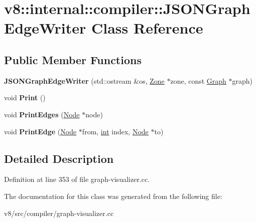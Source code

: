 \hypertarget{classv8_1_1internal_1_1compiler_1_1JSONGraphEdgeWriter}{}\section{v8\+:\+:internal\+:\+:compiler\+:\+:J\+S\+O\+N\+Graph\+Edge\+Writer Class Reference}
\label{classv8_1_1internal_1_1compiler_1_1JSONGraphEdgeWriter}
\subsection*{Public Member Functions}
\begin{DoxyCompactItemize}
\item 
\mbox{\label{classv8_1_1internal_1_1compiler_1_1JSONGraphEdgeWriter_a9193915a7479dc4635125e0f504cab19}} 
{\bfseries J\+S\+O\+N\+Graph\+Edge\+Writer} (std\+::ostream \&os, \mbox{\hyperlink{classv8_1_1internal_1_1Zone}{Zone}} $\ast$zone, const \mbox{\hyperlink{classv8_1_1internal_1_1compiler_1_1Graph}{Graph}} $\ast$graph)
\item 
\mbox{\label{classv8_1_1internal_1_1compiler_1_1JSONGraphEdgeWriter_aff9f180341a91e7ea140ae08df1ed689}} 
void {\bfseries Print} ()
\item 
\mbox{\label{classv8_1_1internal_1_1compiler_1_1JSONGraphEdgeWriter_a45ed893eccb7d258a853f82004e3f3cf}} 
void {\bfseries Print\+Edges} (\mbox{\hyperlink{classv8_1_1internal_1_1compiler_1_1Node}{Node}} $\ast$node)
\item 
\mbox{\label{classv8_1_1internal_1_1compiler_1_1JSONGraphEdgeWriter_a2d46147f53d1ebe6bda29f5c7aced3e6}} 
void {\bfseries Print\+Edge} (\mbox{\hyperlink{classv8_1_1internal_1_1compiler_1_1Node}{Node}} $\ast$from, \mbox{\hyperlink{classint}{int}} index, \mbox{\hyperlink{classv8_1_1internal_1_1compiler_1_1Node}{Node}} $\ast$to)
\end{DoxyCompactItemize}


\subsection{Detailed Description}


Definition at line 353 of file graph-\/visualizer.\+cc.



The documentation for this class was generated from the following file\+:\begin{DoxyCompactItemize}
\item 
v8/src/compiler/graph-\/visualizer.\+cc\end{DoxyCompactItemize}
